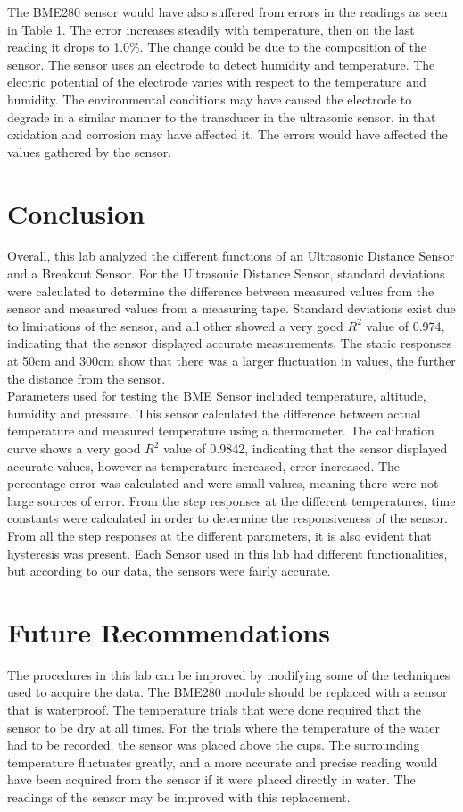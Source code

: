 \documentclass[11pt]{article}
\begin{document}
The BME280 sensor would have also suffered from errors in the readings as seen in Table 1. The error increases steadily with temperature, then on the last reading it drops to 1.0\%. The change could be due to the composition of the sensor. The sensor uses an electrode to detect humidity and temperature. The electric potential of the electrode varies with respect to the temperature and humidity. The environmental conditions may have caused the electrode to degrade in a similar manner to the transducer in the ultrasonic sensor, in that oxidation and corrosion may have affected it. The errors would have affected the values gathered by the sensor. 

\section{Conclusion}
Overall, this lab analyzed the different functions of an Ultrasonic Distance Sensor and a Breakout Sensor. For the Ultrasonic Distance Sensor, standard deviations were calculated to determine the difference between measured values from the sensor and measured values from a measuring tape. Standard deviations exist due to limitations of the sensor, and all other showed a very good $R^{2}$ value of 0.974, indicating that the sensor displayed accurate measurements. The static responses at 50cm and 300cm show that there was a larger fluctuation in values, the further the distance from the sensor.\\ 

Parameters used for testing the BME Sensor included temperature, altitude, humidity and pressure. This sensor calculated the difference between actual temperature and measured temperature using a thermometer. The calibration curve shows a very good $R^{2}$ value of 0.9842, indicating that the sensor displayed accurate values, however as temperature increased, error increased. The percentage error was calculated and were small values, meaning there were not large sources of error. From the step responses at the different temperatures, time constants were calculated in order to determine the responsiveness of the sensor. From all the step responses at the different parameters, it is also evident that hysteresis was present. Each Sensor used in this lab had different functionalities, but according to our data, the sensors were fairly accurate. 

\section{Future Recommendations}
The procedures in this lab can be improved by modifying some of the techniques used to acquire the data. The BME280 module should be replaced with a sensor that is waterproof. The temperature trials that were done required that the sensor to be dry at all times. For the trials where the temperature of the water had to be recorded, the sensor was placed above the cups. The surrounding temperature fluctuates greatly, and a more accurate and precise reading would have been acquired from the sensor if it were placed directly in water. The readings of the sensor may be improved with this replacement. \\
\end{document}
